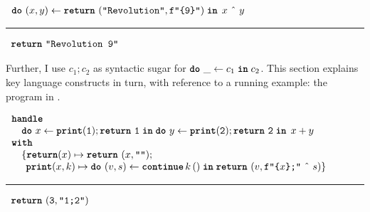 \begin{eff}
$\begin{array}{l}\bind{(x, y)}{\return{(\texttt{"Revolution"}, \texttt{f"\{9\}"})}}{\, x \text{ \^\ } y}\end{array}$
\vspace{2mm} 
\textcolor{effComment}{\hrule height 0.2mm \relax}
\vspace{2mm} 

\textcolor{effComment}{$\begin{array}{l}\texttt{\textbf{return}} \,\, {\texttt{"Revolution 9"}}\end{array}$}
\end{eff}
Further, I use $c_1;c_2$ as syntactic sugar for $\texttt{\textbf{do}} \,\, {\_} \leftarrow {c_1} \; \textbf{\texttt{in}} \; {c_2}$. 
This section explains key language constructs in turn, with reference to a running example: the \efflang{} program in . 


\begin{code}
  \begin{efflst}
    $\begin{array}{l}
      \textbf{\texttt{handle}} \\
      \quad \texttt{\textbf{do}} \,\, {x} \leftarrow {\texttt{\textbf{print}}(\texttt{1});\texttt{\textbf{return}} \,\, {\texttt{1}}} \; \textbf{\texttt{in}} \; {{\texttt{\textbf{do}} \,\, {y} \leftarrow {\texttt{\textbf{print}}(\texttt{2});\texttt{\textbf{return}} \,\, {\texttt{2}}} \; \textbf{\texttt{in}} \; {\, x + y}}} \\
      \textbf{\texttt{with}} \\
      \quad \{ \textbf{\texttt{return}}(x) \mapsto {\texttt{\textbf{return}} \,\, {(x, \texttt{""})}}; \\
      \quad \; \, \textbf{\texttt{print}}(x, k) \mapsto {\texttt{\textbf{do}} \,\, {(v, s)} \leftarrow {\textbf{\texttt{continue}} \, {k} \, {()}} \; \textbf{\texttt{in}} \; {\texttt{\textbf{return}} \,\, {(v, \texttt{f"\{$x$\};"} \text{ \^\ } s)}}}\}\\
    \end{array}$

    \vspace{2mm} 
\textcolor{effComment}{\hrule height 0.2mm \relax}
\vspace{2mm} 

\textcolor{effComment}{$\begin{array}{l}\texttt{\textbf{return}} \,\, {(\texttt{3}, \texttt{"1;2"})}\end{array}$}

  \end{efflst}
  \label{listing:efflang-running-example}
  \end{code}

